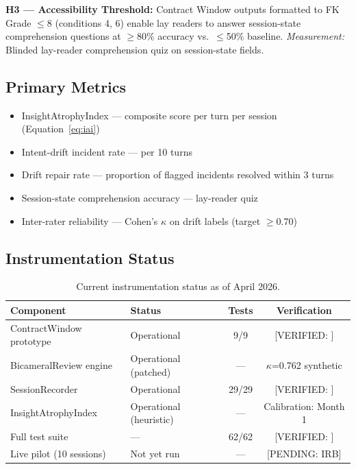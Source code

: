 \documentclass{article}
\newcommand{\cw}{Contract Window\xspace}
\newcommand{\iai}{InsightAtrophyIndex\xspace}
\newcommand{\pending}[1]{\textcolor{pendingred}{[PENDING: #1]}}
\newcommand{\verified}[1]{\textcolor{verifiedgreen}{[VERIFIED: #1]}}
\begin{document}
\textbf{H3 --- Accessibility Threshold:}
\cw{} outputs formatted to FK Grade $\leq$8 (conditions 4, 6) enable lay
readers to answer session-state comprehension questions at $\geq$80\% accuracy
vs.\ $\leq$50\% baseline.
\textit{Measurement:} Blinded lay-reader comprehension quiz on session-state
fields.

\subsection{Primary Metrics}

\begin{itemize}
\item \iai{} --- composite score per turn per session (Equation~\ref{eq:iai})
\item Intent-drift incident rate --- per 10 turns
\item Drift repair rate --- proportion of flagged incidents resolved within
3 turns
\item Session-state comprehension accuracy --- lay-reader quiz
\item Inter-rater reliability --- Cohen's $\kappa$ on drift labels (target
$\geq$0.70)
\end{itemize}

\subsection{Instrumentation Status}

\begin{table}[t]
\centering
\caption{Current instrumentation status as of April 2026.}
\label{tab:instrumentation}
\begin{tabular}{llcc}
\toprule
\textbf{Component} & \textbf{Status} & \textbf{Tests} & \textbf{Verification} \\
\midrule
ContractWindow prototype & Operational & 9/9 & \verified{} \\
BicameralReview engine & Operational (patched) & --- & $\kappa$=0.762 synthetic \\
SessionRecorder & Operational & 29/29 & \verified{} \\
InsightAtrophyIndex & Operational (heuristic) & --- & Calibration: Month 1 \\
Full test suite & --- & 62/62 & \verified{} \\
Live pilot (10 sessions) & Not yet run & --- & \pending{IRB} \\
\bottomrule
\end{tabular}
\end{table}
\end{document}
